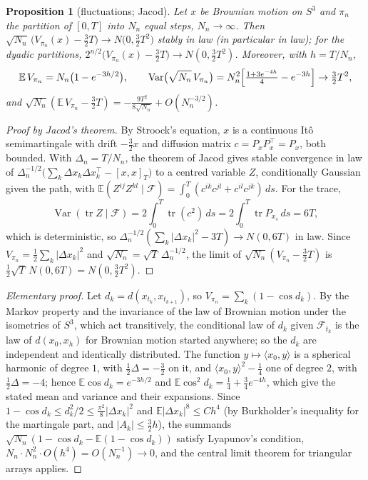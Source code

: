 \documentclass[11pt,reqno]{amsart}
\newtheorem{proposition}[theorem]{Proposition}
\theoremstyle{definition}
\theoremstyle{remark}
\numberwithin{equation}{section}
\newcommand{\ip}[2]{\langle #1,#2\rangle}
\begin{document}
\begin{proposition}[fluctuations; Jacod]\label{prop:clt}
Let $x$ be Brownian motion on $S^3$ and $\pi_n$ the partition of $[0,T]$ into $N_n$ equal steps, $N_n\to\infty$.  Then
$\sqrt{N_n}\,\bigl(V_{\pi_n}(x)-\tfrac32T\bigr)\to N\bigl(0,\tfrac32T^2\bigr)$ stably in law (in particular in law); for the
dyadic partitions, $2^{n/2}\bigl(V_{\pi_n}(x)-\tfrac32T\bigr)\to N(0,\tfrac32T^2)$.  Moreover, with $h=T/N_n$,
\[
\mathbb E\,V_{\pi_n}=N_n\bigl(1-e^{-3h/2}\bigr),\qquad
\operatorname{Var}\bigl(\sqrt{N_n}\,V_{\pi_n}\bigr)=N_n^2\Bigl[\tfrac{1+3e^{-4h}}4-e^{-3h}\Bigr]\to\tfrac32T^2,
\]
and $\sqrt{N_n}(\mathbb E\,V_{\pi_n}-\tfrac32T)=-\tfrac{9T^2}{8\sqrt{N_n}}+O(N_n^{-3/2})$.
\end{proposition}
\begin{proof}[Proof by Jacod's theorem]
By Stroock's equation, $x$ is a continuous It\^o semimartingale with drift $-\tfrac32x$ and diffusion matrix $c=P_xP_x^{\top}=P_x$,
both bounded.  With $\Delta_n=T/N_n$, the theorem of Jacod \cite[Thm.~5.4.2]{JP12} gives stable convergence in law of
$\Delta_n^{-1/2}\bigl(\sum_k\Delta x_k\Delta x_k^{\top}-[x,x]_T\bigr)$ to a centred variable $Z$, conditionally Gaussian given the
path, with $\mathbb E(Z^{ij}Z^{kl}\mid\mathcal F)=\int_0^T(c^{ik}c^{jl}+c^{il}c^{jk})\,ds$.  For the trace,
\[
\operatorname{Var}(\operatorname{tr}Z\mid\mathcal F)=2\int_0^T\operatorname{tr}(c^2)\,ds=2\int_0^T\operatorname{tr}P_{x_s}\,ds=6T,
\]
which is deterministic, so
$\Delta_n^{-1/2}(\sum_k\lvert\Delta x_k\rvert^2-3T)\to N(0,6T)$ in law.  Since $V_{\pi_n}=\tfrac12\sum_k\lvert\Delta x_k\rvert^2$ and
$\sqrt{N_n}=\sqrt T\,\Delta_n^{-1/2}$, the limit of $\sqrt{N_n}(V_{\pi_n}-\tfrac32T)$ is $\tfrac12\sqrt T\,N(0,6T)=N(0,\tfrac32T^2)$.
\end{proof}
\begin{proof}[Elementary proof]
Let $d_k=d(x_{t_k},x_{t_{k+1}})$, so $V_{\pi_n}=\sum_k(1-\cos d_k)$.  By the Markov property and the invariance of the law of
Brownian motion under the isometries of $S^3$, which act transitively, the conditional law of $d_k$ given $\mathcal F_{t_k}$ is the
law of $d(x_0,x_h)$ for Brownian motion started anywhere; so the $d_k$ are independent and identically distributed.  The
function $y\mapsto\ip{x_0}y$ is a spherical harmonic of degree $1$, with $\tfrac12\Delta=-\tfrac32$ on it, and
$\ip{x_0}y^2-\tfrac14$ one of degree $2$, with $\tfrac12\Delta=-4$; hence $\mathbb E\cos d_k=e^{-3h/2}$ and
$\mathbb E\cos^2d_k=\tfrac14+\tfrac34e^{-4h}$, which give the stated mean and variance and their expansions.  Since $1-\cos d_k\le d_k^2/2\le\tfrac{\pi^2}8\lvert\Delta x_k\rvert^2$ and
$\mathbb E\lvert\Delta x_k\rvert^8\le Ch^4$ (by Burkholder's inequality for the martingale part, and $\lvert A_k\rvert\le\tfrac32h$), the summands $\sqrt{N_n}(1-\cos d_k-\mathbb E(1-\cos d_k))$ satisfy Lyapunov's
condition, $N_n\cdot N_n^2\cdot O(h^4)=O(N_n^{-1})\to0$, and the central limit theorem for triangular arrays applies.
\end{proof}
\end{document}
